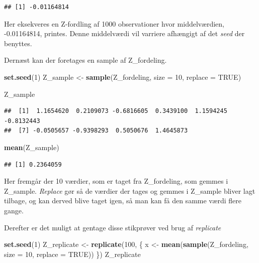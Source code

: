 \documentclass[]{book}
\newenvironment{Shaded}{\begin{snugshade}}{\end{snugshade}}
\newcommand{\DataTypeTok}[1]{\textcolor[rgb]{0.13,0.29,0.53}{#1}}
\newcommand{\DecValTok}[1]{\textcolor[rgb]{0.00,0.00,0.81}{#1}}
\newcommand{\KeywordTok}[1]{\textcolor[rgb]{0.13,0.29,0.53}{\textbf{#1}}}
\newcommand{\NormalTok}[1]{#1}
\newcommand{\OtherTok}[1]{\textcolor[rgb]{0.56,0.35,0.01}{#1}}
\newcommand{\StringTok}[1]{\textcolor[rgb]{0.31,0.60,0.02}{#1}}
\theoremstyle{definition}
\theoremstyle{definition}
\theoremstyle{definition}
\theoremstyle{remark}
\begin{document}
\begin{verbatim}
## [1] -0.01164814
\end{verbatim}

Her eksekveres en Z-fordling af 1000 observationer hvor middelværdien, -0.01164814, printes. Denne middelværdi vil varriere afhængigt af det \emph{seed} der benyttes.

Dernæst kan der foretages en sample af Z\_fordeling.

\begin{Shaded}
\begin{Highlighting}[]
\KeywordTok{set.seed}\NormalTok{(}\DecValTok{1}\NormalTok{)}
\NormalTok{Z_sample <-}\StringTok{ }\KeywordTok{sample}\NormalTok{(Z_fordeling, }\DataTypeTok{size =} \DecValTok{10}\NormalTok{, }\DataTypeTok{replace =} \OtherTok{TRUE}\NormalTok{)}

\NormalTok{Z_sample}
\end{Highlighting}
\end{Shaded}

\begin{verbatim}
##  [1]  1.1654620  0.2109073 -0.6816605  0.3439100  1.1594245 -0.8132443
##  [7] -0.0505657 -0.9398293  0.5050676  1.4645873
\end{verbatim}

\begin{Shaded}
\begin{Highlighting}[]
\KeywordTok{mean}\NormalTok{(Z_sample)}
\end{Highlighting}
\end{Shaded}

\begin{verbatim}
## [1] 0.2364059
\end{verbatim}

Her fremgår der 10 værdier, som er taget fra Z\_fordeling, som gemmes i Z\_sample. \emph{Replace} gør så de værdier der tages og gemmes i Z\_sample bliver lagt tilbage, og kan derved blive taget igen, så man kan få den samme værdi flere gange.

Derefter er det muligt at gentage disse stikprøver ved brug af \emph{replicate}

\begin{Shaded}
\begin{Highlighting}[]
\KeywordTok{set.seed}\NormalTok{(}\DecValTok{1}\NormalTok{)}
\NormalTok{Z_replicate <-}\StringTok{ }\KeywordTok{replicate}\NormalTok{(}\DecValTok{100}\NormalTok{, \{}
\NormalTok{  x <-}\StringTok{ }\KeywordTok{mean}\NormalTok{(}\KeywordTok{sample}\NormalTok{(Z_fordeling, }\DataTypeTok{size =} \DecValTok{10}\NormalTok{, }\DataTypeTok{replace =} \OtherTok{TRUE}\NormalTok{))}
\NormalTok{\})}
\NormalTok{Z_replicate}
\end{Highlighting}
\end{Shaded}
\end{document}
